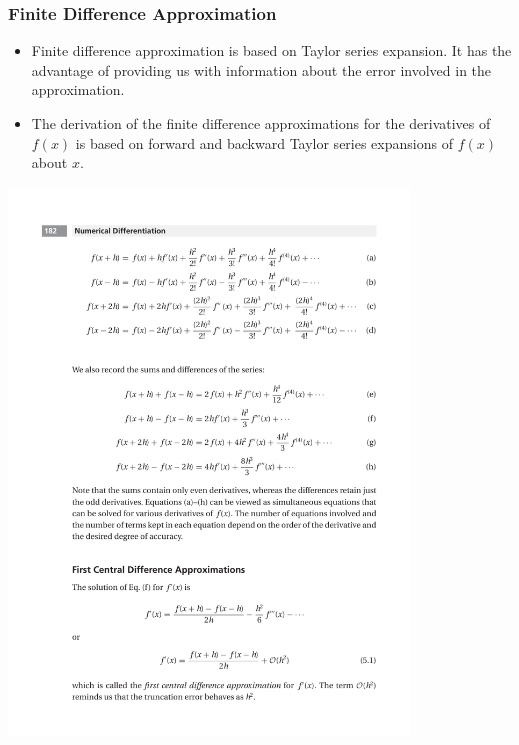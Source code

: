 \documentclass{beamer}
\begin{document}
\begin{frame}[fragile]
\frametitle{Finite Difference Approximation}
\begin{itemize}
\item  Finite difference approximation is based on Taylor series expansion. It has the advantage of providing us with information about the \alert{error} involved in the approximation.

\item The derivation of the finite difference approximations for the derivatives of $f(x)$ is based on \alert{forward} and \alert{backward} Taylor series expansions of $f(x)$ about $x$.
\end{itemize}
\centerline{\includegraphics[width=0.8\textwidth]{Lec9_fig1}}
\end{frame}
\end{document}

